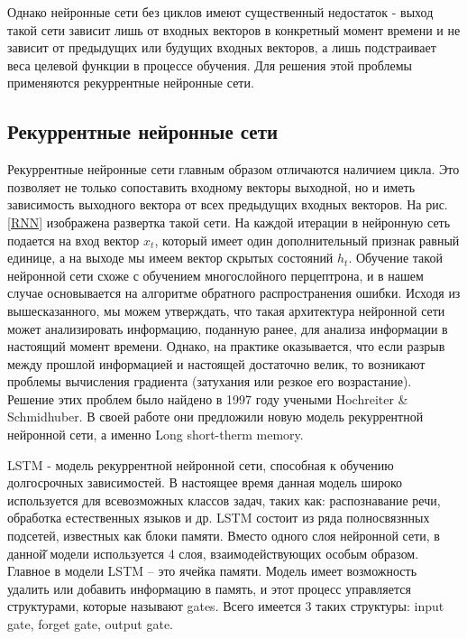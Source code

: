     Однако нейронные сети без циклов имеют существенный недостаток - выход такой сети зависит лишь от входных векторов в конкретный момент времени и не зависит от предыдущих или будущих входных векторов, а лишь подстраивает веса целевой функции в процессе обучения. Для решения этой проблемы применяются рекуррентные нейронные сети.

    \subsection{Рекуррентные нейронные сети}
    Рекуррентные нейронные сети главным образом отличаются наличием цикла. Это позволяет не только сопоставить входному векторы выходной, но и иметь зависимость выходного вектора от всех предыдущих входных векторов. На рис. \ref{RNN} изображена развертка такой сети. На каждой итерации в нейронную сеть подается на вход вектор $x_{t}$, который имеет один дополнительный признак равный единице, а на выходе мы имеем вектор скрытых состояний $h_{t}$.
    Обучение такой нейронной сети схоже с обучением многослойного перцептрона, и в нашем случае основывается на алгоритме обратного распространения ошибки. Исходя из вышесказанного, мы можем утверждать, что такая архитектура нейронной сети может анализировать информацию, поданную ранее, для анализа информации в настоящий момент времени. Однако, на практике оказывается, что если разрыв между прошлой информацией и настоящей достаточно велик, то возникают проблемы вычисления градиента (затухания или резкое его возрастание). Решение этих проблем было найдено в 1997 году учеными Hochreiter \& Schmidhuber. В своей работе они предложили новую модель рекуррентной нейронной сети, а именно Long short-therm memory.

    LSTM - модель рекуррентной нейронной сети, способная к обучению долгосрочных зависимостей. В настоящее время данная модель широко используется для всевозможных классов задач, таких как: распознавание речи, обработка естественных языков и др. LSTM состоит из ряда полносвязнных подсетей, известных как блоки памяти. Вместо одного слоя нейронной сети, в данной̆ модели используется 4 слоя, взаимодействующих особым образом. Главное в модели LSTM – это ячейка памяти. Модель имеет возможность удалить или добавить информацию в память, и этот процесс управляется структурами, которые называют gates. Всего имеется 3 таких структуры: input gate, forget gate, output gate.

